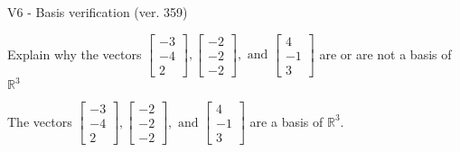 \begin{exercise}
  \begin{exerciseTitle}V6 - Basis verification (ver. 359)\end{exerciseTitle}
  \begin{exerciseStatement}
    Explain why the vectors \(\left[\begin{array}{r}
-3 \\
-4 \\
2
\end{array}\right] , \left[\begin{array}{r}
-2 \\
-2 \\
-2
\end{array}\right] , \text{ and } \left[\begin{array}{r}
4 \\
-1 \\
3
\end{array}\right]\) are or are not a basis of \(\mathbb{R}^3\)	


  \end{exerciseStatement}
  \begin{exerciseAnswer}
   The vectors \(\left[\begin{array}{r}
-3 \\
-4 \\
2
\end{array}\right] , \left[\begin{array}{r}
-2 \\
-2 \\
-2
\end{array}\right] , \text{ and } \left[\begin{array}{r}
4 \\
-1 \\
3
\end{array}\right]\) 
  	 are  a basis of \(\mathbb{R}^3\).
  


  \end{exerciseAnswer}
\end{exercise}